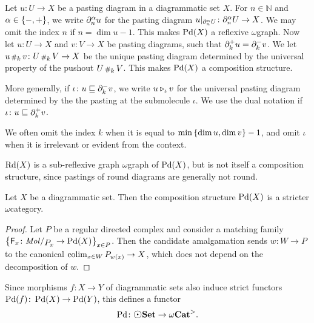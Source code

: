 \begin{dfn} 
    Let \( u \colon U \to X \) be a pasting diagram in a diagrammatic set \( X \).
    For \( n \in \mathbb{N} \) and \( \alpha \in \left\{ {-, +} \right\} \), we write \( \partial_{n}^{\alpha} u \) for the pasting diagram \( \restr{u}{\bd{n}{\a}U} \colon \bd{n}{\a} U \to X \).
    We may omit the index \( n \) if \( n = \dim u - 1 \).
    This makes \( \operatorname{Pd}(X) \) a reflexive \( \omega \)\nbd graph.
    Now let \( u \colon U \to X \) and \( v \colon V \to X \) be pasting diagrams, such that \( \partial_{k}^{+} u = \partial_{k}^{-} v \).
    We let \( u \,{\scriptstyle\#}_{k}\, v \colon U \,{\scriptstyle\#}_{k}\, V \to X \) be the unique pasting diagram determined by the universal property of the pushout \( U \,{\scriptstyle\#}_{k}\, V \).
    This makes \( \operatorname{Pd}(X) \) a composition structure.

    More generally, if \( \iota \colon u \sqsubseteq \partial_{k}^{-} v \), we write \( u \triangleright_{\iota} v \) for the universal pasting diagram determined by the the pasting at the submolecule \( \iota \).
    We use the dual notation if \( \iota \colon u \sqsubseteq \partial_{k}^{+} v \). 

    We often omit the index \( k \) when it is equal to \( \min \left\{ {\dim u, \dim v} \right\} - 1 \), and omit \( \iota \) when it is irrelevant or evident from the context.

\end{dfn}

\begin{rmk}
    \( \operatorname{Rd}(X) \) is a sub-reflexive graph \( \omega \)\nbd graph of \( \operatorname{Pd}(X) \), but is not itself a composition structure, since pastings of round diagrams are generally not round. 
\end{rmk}

\begin{lem} \label{lem:Pd_is_stricter}
    Let \( X \) be a diagrammatic set.
    Then the composition structure \( \operatorname{Pd}(X) \) is a stricter \( \omega \)\nbd category.
\end{lem}
\begin{proof}
    Let \( P \) be a regular directed complex and consider a matching family \( \set{\F_x \colon \molecin{\imel{P}{x}} \to \Pd(X)}_{x \in P} \).
    Then the candidate amalgamation sends \( w \colon W \to P \) to the canonical \( \operatorname*{colim}_{x \in W} {P}_{w(x)} \to X \), which does not depend on the decomposition of \( w \).
\end{proof}

\noindent Since morphisms \( f \colon X \to Y \) of diagrammatic sets also induce strict functors \( \operatorname{Pd}(f) \colon \operatorname{Pd}(X) \to \operatorname{Pd}(Y) \), this defines a functor
\begin{equation*}
    \Pd \colon \dgmSet \to \somegaCat.
\end{equation*}

